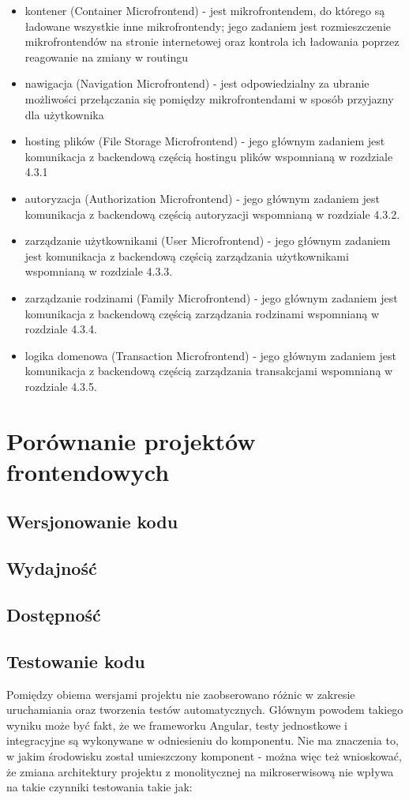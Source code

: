 \documentclass{SGGW-thesis}
\begin{document}
  \begin{itemize}
    \item kontener (Container Microfrontend) - jest mikrofrontendem, do którego są ładowane wszystkie inne mikrofrontendy; jego zadaniem jest rozmieszczenie mikrofrontendów na stronie internetowej oraz kontrola ich ładowania poprzez reagowanie na zmiany w routingu
    \item nawigacja (Navigation Microfrontend) - jest odpowiedzialny za ubranie możliwości przełączania się pomiędzy mikrofrontendami w sposób przyjazny dla użytkownika
    \item hosting plików (File Storage Microfrontend) - jego głównym zadaniem jest komunikacja z backendową częścią hostingu plików wspomnianą w rozdziale 4.3.1
    \item autoryzacja (Authorization Microfrontend) - jego głównym zadaniem jest komunikacja z backendową częścią autoryzacji wspomnianą w rozdziale 4.3.2.
    \item zarządzanie użytkownikami (User Microfrontend) - jego głównym zadaniem jest komunikacja z backendową częścią zarządzania użytkownikami wspomnianą w rozdziale 4.3.3.
    \item zarządzanie rodzinami (Family Microfrontend) - jego głównym zadaniem jest komunikacja z backendową częścią zarządzania rodzinami wspomnianą w rozdziale 4.3.4.
    \item logika domenowa (Transaction Microfrontend) - jego głównym zadaniem jest komunikacja z backendową częścią zarządzania transakcjami wspomnianą w rozdziale 4.3.5.
  \end{itemize}



\chapter{Porównanie projektów frontendowych}
  \section{Wersjonowanie kodu}
  \section{Wydajność}
  \section{Dostępność}
  \section{Testowanie kodu}
  Pomiędzy obiema wersjami projektu nie zaobserowano różnic w zakresie uruchamiania oraz tworzenia testów automatycznych. Głównym powodem takiego wyniku może być fakt, że we frameworku Angular, testy jednostkowe i integracyjne są wykonywane w odniesieniu do komponentu. Nie ma znaczenia to, w jakim środowisku został umieszczony komponent - można więc też wnioskować, że zmiana architektury projektu z monolitycznej na mikroserwisową nie wpływa na takie czynniki testowania takie jak:
  
\end{document}
